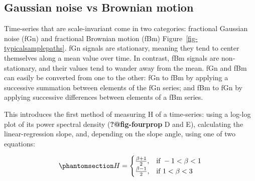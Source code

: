 \documentclass[
  sn-vancouver,
  Numbered,
  referee,
  lineno]{sn-jnl}
\begin{document}
\subsection{Gaussian noise vs Brownian
motion}\label{gaussian-noise-vs-brownian-motion}

Time-series that are scale-invariant come in two categories: fractional
Gaussian noise (fGn) and fractional Brownian motion (fBm)
Figure~\ref{fig-typicalsamplepaths}. fGn signals are stationary, meaning
they tend to center themselves along a mean value over time. In
contrast, fBm signals are non-stationary, and their values tend to
wander away from the mean. fGn and fBm can easily be converted from one
to the other: fGn to fBm by applying a successive summation between
elements of the fGn series; and fBm to fGn by applying successive
differences between elements of a fBm series.

This introduces the first method of measuring H of a time-series: using
a log-log plot of its power spectral density (\textbf{?@fig-fourprop} D
and E), calculating the linear-regression slope, and, depending on the
slope angle, using one of two equations:

\begin{equation}\phantomsection\label{eq-psdH}{
H =
\begin{cases}
\frac{\beta + 1}{2}, & \text{if } -1 < \beta < 1 \\
\frac{\beta - 1}{2}, & \text{if } 1 < \beta < 3
\end{cases}
}\end{equation}
\end{document}
